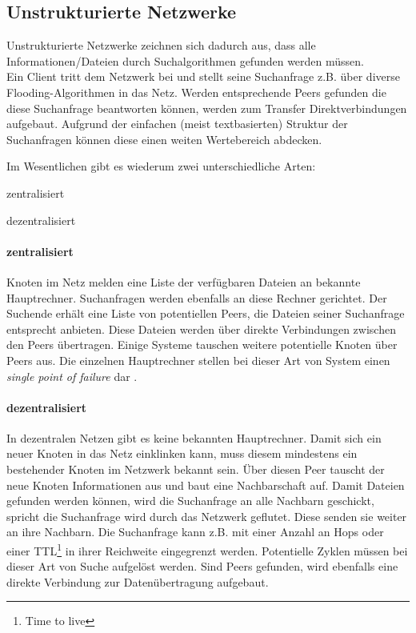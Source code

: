\subsection{Unstrukturierte Netzwerke}
Unstrukturierte Netzwerke zeichnen sich dadurch aus, dass alle Informationen/Dateien durch Suchalgorithmen \cite{Lv2002} gefunden werden müssen. \\
Ein Client tritt dem Netzwerk bei und stellt seine Suchanfrage z.B. über diverse Flooding-Algorithmen in das Netz. Werden entsprechende Peers gefunden die diese Suchanfrage beantworten können, werden zum Transfer Direktverbindungen aufgebaut. Aufgrund der einfachen (meist textbasierten) Struktur der Suchanfragen können diese einen weiten Wertebereich abdecken.

Im Wesentlichen gibt es wiederum zwei unterschiedliche Arten:
\begin{itemize*}
\item zentralisiert
\item dezentralisiert
\end{itemize*}

\paragraph{zentralisiert} Knoten im Netz melden eine Liste der verfügbaren Dateien an bekannte Hauptrechner. Suchanfragen werden ebenfalls an diese Rechner gerichtet. Der Suchende erhält eine Liste von potentiellen Peers, die Dateien seiner Suchanfrage entsprecht anbieten. Diese Dateien werden über direkte Verbindungen zwischen den Peers übertragen. Einige Systeme tauschen weitere potentielle Knoten über Peers aus. Die einzelnen Hauptrechner stellen bei dieser Art von System einen \emph{single point of failure} dar \cite{Eberspaecher2005}.

\paragraph{dezentralisiert} In dezentralen Netzen gibt es keine bekannten Hauptrechner. Damit sich ein neuer Knoten in das Netz einklinken kann, muss diesem mindestens ein bestehender Knoten im Netzwerk bekannt sein. Über diesen Peer tauscht der neue Knoten Informationen aus und baut eine Nachbarschaft auf. Damit Dateien gefunden werden können, wird die Suchanfrage an alle Nachbarn geschickt, spricht die Suchanfrage wird durch das Netzwerk geflutet.  Diese senden sie weiter an ihre Nachbarn. Die Suchanfrage kann z.B. mit einer Anzahl an Hops oder einer TTL\footnote{Time to live} in ihrer Reichweite eingegrenzt werden. Potentielle Zyklen müssen bei dieser Art von Suche aufgelöst werden. Sind Peers gefunden, wird ebenfalls eine direkte Verbindung zur Datenübertragung aufgebaut.


